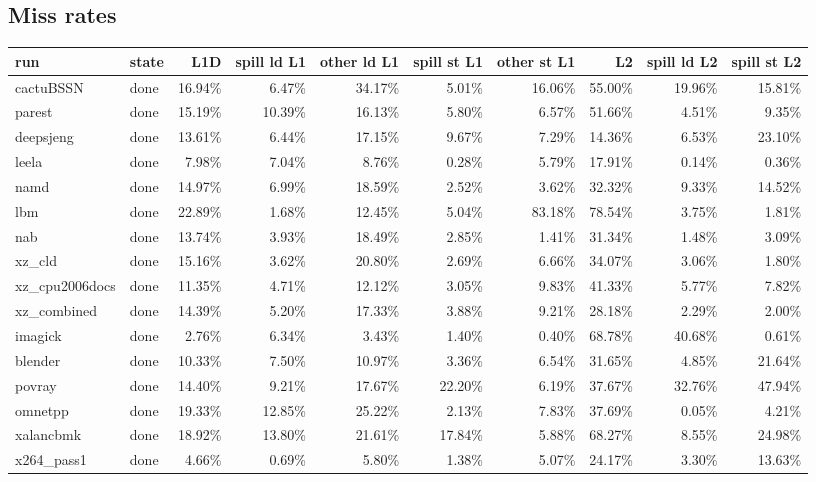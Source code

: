 \documentclass[10pt,a4paper,landscape]{article}
\begin{document}
\subsection*{Miss rates}
{\footnotesize
\begin{longtable}{llrrrrrrrr}
\toprule
run & state & L1D & spill ld L1 & other ld L1 & spill st L1 & other st L1 & L2 & spill ld L2 & spill st L2 \\
\midrule
\endhead
\bottomrule
\endfoot
cactuBSSN & done & 16.94\% & 6.47\% & 34.17\% & 5.01\% & 16.06\% & 55.00\% & 19.96\% & 15.81\% \\
parest & done & 15.19\% & 10.39\% & 16.13\% & 5.80\% & 6.57\% & 51.66\% & 4.51\% & 9.35\% \\
deepsjeng & done & 13.61\% & 6.44\% & 17.15\% & 9.67\% & 7.29\% & 14.36\% & 6.53\% & 23.10\% \\
leela & done & 7.98\% & 7.04\% & 8.76\% & 0.28\% & 5.79\% & 17.91\% & 0.14\% & 0.36\% \\
namd & done & 14.97\% & 6.99\% & 18.59\% & 2.52\% & 3.62\% & 32.32\% & 9.33\% & 14.52\% \\
lbm & done & 22.89\% & 1.68\% & 12.45\% & 5.04\% & 83.18\% & 78.54\% & 3.75\% & 1.81\% \\
nab & done & 13.74\% & 3.93\% & 18.49\% & 2.85\% & 1.41\% & 31.34\% & 1.48\% & 3.09\% \\
xz\_cld & done & 15.16\% & 3.62\% & 20.80\% & 2.69\% & 6.66\% & 34.07\% & 3.06\% & 1.80\% \\
xz\_cpu2006docs & done & 11.35\% & 4.71\% & 12.12\% & 3.05\% & 9.83\% & 41.33\% & 5.77\% & 7.82\% \\
xz\_combined & done & 14.39\% & 5.20\% & 17.33\% & 3.88\% & 9.21\% & 28.18\% & 2.29\% & 2.00\% \\
imagick & done & 2.76\% & 6.34\% & 3.43\% & 1.40\% & 0.40\% & 68.78\% & 40.68\% & 0.61\% \\
blender & done & 10.33\% & 7.50\% & 10.97\% & 3.36\% & 6.54\% & 31.65\% & 4.85\% & 21.64\% \\
povray & done & 14.40\% & 9.21\% & 17.67\% & 22.20\% & 6.19\% & 37.67\% & 32.76\% & 47.94\% \\
omnetpp & done & 19.33\% & 12.85\% & 25.22\% & 2.13\% & 7.83\% & 37.69\% & 0.05\% & 4.21\% \\
xalancbmk & done & 18.92\% & 13.80\% & 21.61\% & 17.84\% & 5.88\% & 68.27\% & 8.55\% & 24.98\% \\
x264\_pass1 & done & 4.66\% & 0.69\% & 5.80\% & 1.38\% & 5.07\% & 24.17\% & 3.30\% & 13.63\% \\

\end{longtable}}
\end{document}
